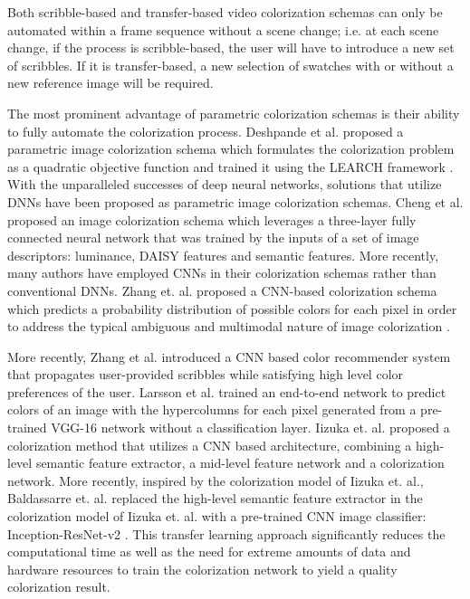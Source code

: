 \documentclass[10pt,twocolumn,letterpaper]{article}
\begin{document}
Both scribble-based and transfer-based video colorization schemas can only be automated within a frame sequence without a scene change; i.e. at each scene change, if the process is scribble-based, the user will have to introduce a new set of scribbles. If it is transfer-based, a new selection of swatches with or without a new reference image will be required. 

The most prominent advantage of parametric colorization schemas is their ability to fully automate the colorization process. Deshpande et al. \cite{7410429} proposed a parametric image colorization schema which formulates the colorization problem as a quadratic objective function and trained it using the LEARCH framework \cite{Ratliff2009}. With the unparalleled successes of deep neural networks, solutions that utilize DNNs have been proposed as parametric image colorization schemas. Cheng et al. \cite{DBLP:journals/corr/ChengYS16} proposed an image colorization schema which leverages a three-layer fully connected neural network that was trained by the inputs of a set of image descriptors: luminance, DAISY features \cite{4587673} and semantic features.  More recently,  many authors have employed CNNs in their colorization schemas rather than conventional DNNs. Zhang et. al. \cite{DBLP:journals/corr/ZhangIE16} proposed a CNN-based colorization schema which predicts a probability distribution of possible colors for each pixel in order to address the typical ambiguous and multimodal nature of image colorization \cite{10.1007/978-3-540-88690-7_10}.

More recently, Zhang et al. \cite{DBLP:journals/corr/ZhangZIGLYE17} introduced a CNN based color recommender system that propagates user-provided scribbles while satisfying high level color preferences of the user. Larsson et al. \cite{DBLP:journals/corr/LarssonMS16} trained an end-to-end network to predict colors of an image with the hypercolumns \cite{DBLP:journals/corr/HariharanAGM14a} for each pixel generated from a pre-trained VGG-16 network without a classification layer. Iizuka et. al. \cite{Iizuka:2016:LCJ:2897824.2925974} proposed a colorization method that utilizes a CNN based architecture, combining a high-level semantic feature extractor, a mid-level feature network and a colorization network. More recently, inspired by the colorization model of Iizuka et. al., Baldassarre et. al. \cite{DBLP:journals/corr/abs-1712-03400} replaced the high-level semantic feature extractor in the colorization model of Iizuka et. al. with a pre-trained CNN image classifier: Inception-ResNet-v2 \cite{DBLP:journals/corr/SzegedyVISW15}. This transfer learning approach significantly reduces the computational time as well as the need for extreme amounts of data and hardware resources to train the colorization network to yield a quality colorization result.
\end{document}
